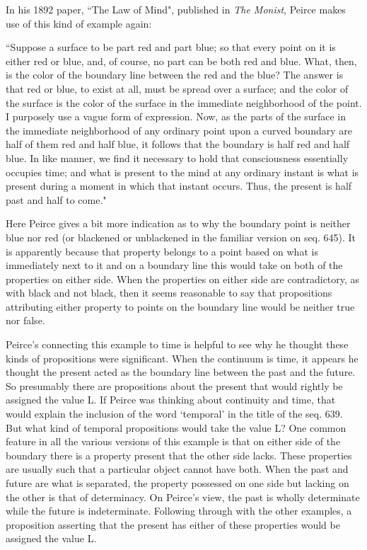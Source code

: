 \documentclass[12pt]{article}
\begin{document}
In his 1892 paper, ``The Law of Mind", published in \textit{The Monist}, Peirce makes use of this kind of example again:
\begin{singlespace}
``Suppose a surface to be part red and part blue; so that every point on it is either red or blue, and, of course, no part can be both red and blue. What, then, is the color of the boundary line between the red and the blue? The answer is that red or blue, to exist at all, must be spread over a surface; and the color of the surface is the color of the surface in the immediate neighborhood of the point. I purposely use a vague form of expression. Now, as the parts of the surface in the immediate neighborhood of any ordinary point upon a curved boundary are half of them red and half blue, it follows that the boundary is half red and half blue. In like manner, we find it necessary to hold that consciousness essentially occupies time; and what is present to the mind at any ordinary instant is what is present during a moment in which that instant occurs. Thus, the present is half past and half to come."
\end{singlespace}
\noindent Here Peirce gives a bit more indication as to why the boundary point is neither blue nor red (or blackened or unblackened in the familiar version on seq. 645). It is apparently because that property belongs to a point based on what is immediately next to it and on a boundary line this would take on both of the properties on either side. When the properties on either side are contradictory, as with black and not black, then it seems reasonable to say that propositions attributing either property to points on the boundary line would be neither true nor false. 

Peirce's connecting this example to time is helpful to see why he thought these kinds of propositions were significant. When the continuum is time, it appears he thought the present acted as the boundary line between the past and the future. So presumably there are propositions about the present that would rightly be assigned the value L. If Peirce was thinking about continuity and time, that would explain the inclusion of the word `temporal' in the title of the seq. 639. But what kind of temporal propositions would take the value L? One common feature in all the various versions of this example is that on either side of the boundary there is a property present that the other side lacks. These properties are usually such that a particular object cannot have both. When the past and future are what is separated, the property possessed on one side but lacking on the other is that of determinacy. On Peirce's view, the past is wholly determinate while the future is indeterminate. Following through with the other examples, a proposition asserting that the present has either of these properties would be assigned the value L.
\end{document}
